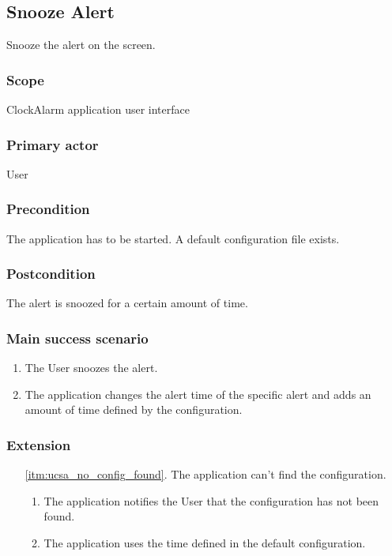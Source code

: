 \subsection{Snooze Alert}
Snooze the alert on the screen.
\subsubsection{Scope}
ClockAlarm application user interface
\subsubsection{Primary actor}
User
\subsubsection{Precondition}
The application has to be started. A default configuration file exists.
\subsubsection{Postcondition}
The alert is snoozed for a certain amount of time.
\subsubsection{Main success scenario}
\begin{enumerate}
    \item The User snoozes the alert.
    \item\label{itm:ucsa_no_config_found} The application changes the alert 
        time of the specific alert and adds an amount of time defined by the
        configuration.
\end{enumerate}
\subsubsection{Extension}
\begin{enumerate}
	\item[\ref{itm:ucsa_no_config_found}.] The application can't find the 
        configuration.
		\begin{enumerate}[i]
			\item The application notifies the User that the configuration
                has not been found.
			\item The application uses the time defined in the default 
                configuration.
		\end{enumerate}
\end{enumerate}
